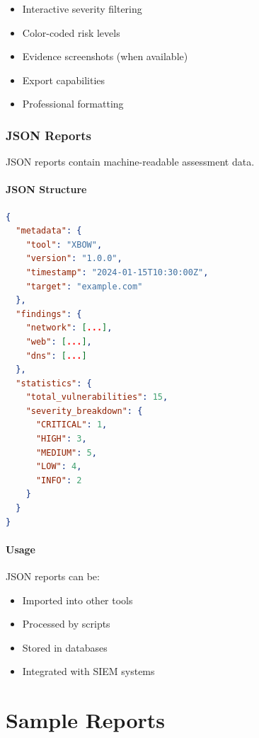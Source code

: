 \documentclass[12pt,a4paper]{report}
\begin{document}
\begin{itemize}
    \item Interactive severity filtering
    \item Color-coded risk levels
    \item Evidence screenshots (when available)
    \item Export capabilities
    \item Professional formatting
\end{itemize}

\subsection{JSON Reports}

JSON reports contain machine-readable assessment data.

\subsubsection{JSON Structure}

\begin{lstlisting}[language=json]
{
  "metadata": {
    "tool": "XBOW",
    "version": "1.0.0",
    "timestamp": "2024-01-15T10:30:00Z",
    "target": "example.com"
  },
  "findings": {
    "network": [...],
    "web": [...],
    "dns": [...]
  },
  "statistics": {
    "total_vulnerabilities": 15,
    "severity_breakdown": {
      "CRITICAL": 1,
      "HIGH": 3,
      "MEDIUM": 5,
      "LOW": 4,
      "INFO": 2
    }
  }
}
\end{lstlisting}

\subsubsection{Usage}

JSON reports can be:

\begin{itemize}
    \item Imported into other tools
    \item Processed by scripts
    \item Stored in databases
    \item Integrated with SIEM systems
\end{itemize}

\chapter{Sample Reports}
\end{document}
